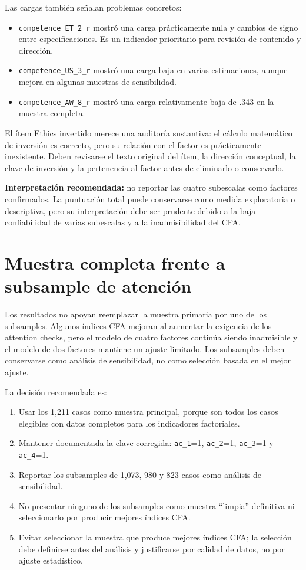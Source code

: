 \documentclass[11pt,a4paper]{article}
\begin{document}
Las cargas también señalan problemas concretos:

\begin{itemize}[leftmargin=*]
  \item \texttt{competence\_ET\_2\_r} mostró una carga prácticamente nula y cambios de signo entre especificaciones. Es un indicador prioritario para revisión de contenido y dirección.
  \item \texttt{competence\_US\_3\_r} mostró una carga baja en varias estimaciones, aunque mejora en algunas muestras de sensibilidad.
  \item \texttt{competence\_AW\_8\_r} mostró una carga relativamente baja de .343 en la muestra completa.
\end{itemize}

El ítem Ethics invertido merece una auditoría sustantiva: el cálculo matemático de inversión es correcto, pero su relación con el factor es prácticamente inexistente. Deben revisarse el texto original del ítem, la dirección conceptual, la clave de inversión y la pertenencia al factor antes de eliminarlo o conservarlo.

\textbf{Interpretación recomendada:} no reportar las cuatro subescalas como factores confirmados. La puntuación total puede conservarse como medida exploratoria o descriptiva, pero su interpretación debe ser prudente debido a la baja confiabilidad de varias subescalas y a la inadmisibilidad del CFA.

\section{Muestra completa frente a subsample de atención}

Los resultados no apoyan reemplazar la muestra primaria por uno de los subsamples. Algunos índices CFA mejoran al aumentar la exigencia de los attention checks, pero el modelo de cuatro factores continúa siendo inadmisible y el modelo de dos factores mantiene un ajuste limitado. Los subsamples deben conservarse como análisis de sensibilidad, no como selección basada en el mejor ajuste.

La decisión recomendada es:

\begin{enumerate}[leftmargin=*]
  \item Usar los 1,211 casos como muestra principal, porque son todos los casos elegibles con datos completos para los indicadores factoriales.
  \item Mantener documentada la clave corregida: \texttt{ac\_1}=1, \texttt{ac\_2}=1, \texttt{ac\_3}=1 y \texttt{ac\_4}=1.
  \item Reportar los subsamples de 1,073, 980 y 823 casos como análisis de sensibilidad.
  \item No presentar ninguno de los subsamples como muestra ``limpia'' definitiva ni seleccionarlo por producir mejores índices CFA.
  \item Evitar seleccionar la muestra que produce mejores índices CFA; la selección debe definirse antes del análisis y justificarse por calidad de datos, no por ajuste estadístico.
\end{enumerate}
\end{document}
